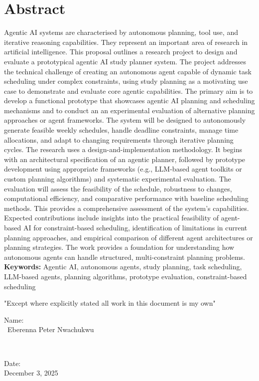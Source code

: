 \documentclass[12pt]{article}
\begin{document}
\section*{Abstract}
Agentic AI systems are characterised by autonomous planning, tool use, and iterative reasoning capabilities. They represent an important area of research in artificial intelligence. This proposal outlines a research project to design and evaluate a prototypical agentic AI study planner system. The project addresses the technical challenge of creating an autonomous agent capable of dynamic task scheduling under complex constraints, using study planning as a motivating use case to demonstrate and evaluate core agentic capabilities. The primary aim is to develop a functional prototype that showcases agentic AI planning and scheduling mechanisms and to conduct an  an experimental evaluation of alternative planning approaches or agent frameworks. The system will be designed to autonomously generate feasible weekly schedules, handle deadline constraints, manage time allocations, and adapt to changing requirements through iterative planning cycles. The research uses a design-and-implementation methodology. It begins with an architectural specification of an agentic planner, followed by prototype development using appropriate frameworks (e.g., LLM-based agent toolkits or custom planning algorithms) and systematic experimental evaluation. The evaluation will assess the feasibility of the schedule, robustness to changes, computational efficiency, and comparative performance with baseline scheduling methods. This provides a comprehensive assessment of the system’s capabilities. Expected contributions include insights into the practical feasibility of agent-based AI for constraint-based scheduling, identification of limitations in current planning approaches, and empirical comparison of different agent architectures or planning strategies. The work provides a foundation for understanding how autonomous agents can handle structured, multi-constraint planning problems. 
\newline
\textbf{Keywords:} 
Agentic AI, autonomous agents, study planning, task scheduling, LLM-based agents, planning algorithms, prototype evaluation, constraint-based scheduling

\vfill
"Except where explicitly stated all work in this document is my own"

\vspace{5mm}

\begin{minipage}{0.4\textwidth}
		\begin{flushleft} 
			Name: \\
			\ Eberenna Peter Nwachukwu
			\end{flushleft}
			\end{minipage}~
			\begin{minipage}{0.4\textwidth}
			\begin{flushright} 
			Date: \\
			December 3, 2025								%
		\end{flushright}
	\end{minipage}\\[2 cm]
\end{document}
